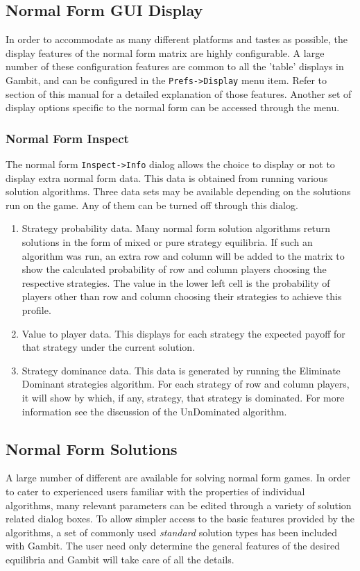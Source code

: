 {\subsection{Normal Form GUI Display}
In order to accommodate as many different platforms and tastes as possible,
the display features of the normal form matrix are highly configurable.  A
large number of these configuration features are common to all the 'table'
displays in Gambit, and can be configured in the {\tt Prefs->Display} 
menu item.  Refer to  section
of this manual for a detailed explanation of those features.  Another set
of display options specific to the normal form can be accessed through the 
 menu.

\subsubsection{Normal Form Inspect}\label{nfinspectsec}
The normal form {\tt Inspect->Info} dialog allows the choice to 
display or not to display extra
normal form data.  This data is obtained from running various solution
algorithms.  Three data sets may be available depending on the solutions
run on the game.  Any of them can be turned off through this dialog.
\begin{enumerate}
\item Strategy probability data.  Many normal form solution
algorithms return solutions in the form of mixed or pure strategy
equilibria.  If such an algorithm was run, an extra row and column will be
added to the matrix to show the calculated probability of row and column
players choosing the respective strategies.  The value in the lower left
cell is the probability of players other than row and column choosing
their strategies to achieve this profile.
\item Value to player data.  This displays for each strategy the expected 
payoff for that strategy under the current solution.  
\item Strategy dominance data.  This data is generated by running
the Eliminate Dominant strategies algorithm.  For each strategy of row and
column players, it will show by which, if any, strategy, that strategy is
dominated.  For more information see the discussion of the UnDominated
algorithm.
\end{enumerate}

\subsection{Normal Form Solutions}\label{NormalFormSolutions}
A large number of different  are 
available for solving normal form
games.  In order to cater to experienced users familiar with the 
properties of individual algorithms, many relevant parameters can
be edited through a variety of solution related dialog boxes.  To allow 
simpler access to the basic features provided by the algorithms, a set of
commonly used {\em standard} solution types has been included with Gambit.
The user need only determine the general features of the desired equilibria
and Gambit will take care of all the details.

}
